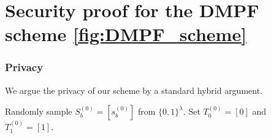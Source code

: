 \section{Security proof for the DMPF scheme \ref{fig:DMPF_scheme}}\label{sec_security_proof}
\subsubsection{Privacy}
\newpage
We argue the privacy of our scheme by a standard hybrid argument. 
\begin{algorithm}[H]
	\begin{algorithmic}[1]
		\caption{$Hyb_j(1^\lambda, b,A,B)$}
		\State Randomly sample $S_b^{(0)} = [s_b^{(0)}]$ from $\{0,1\}^\lambda$.
		\State Set $T_0^{(0)} = [0]$ and $T_1^{(0)} = [1]$. 
		

\end{algorithmic}
\end{algorithm}
